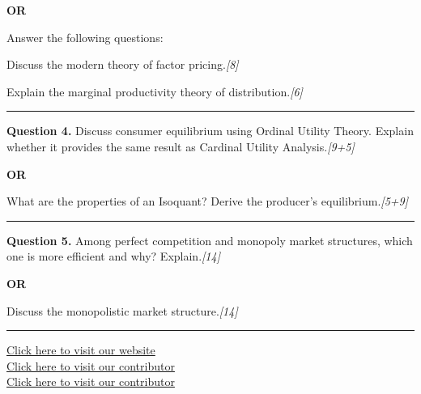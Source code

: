 \documentclass[11pt,a4paper]{article}
\newcommand{\pts}[1]{\hfill   \textit{[#1]}}
\begin{document}
\centerline{   \textbf{OR}}

Answer the following questions:

\begin{parts}
  \item Discuss the modern theory of factor pricing.\pts{8}
  \item Explain the marginal productivity theory of distribution.\pts{6}
\end{parts}

\medskip\rule{\linewidth}{0.2pt}




\noindent   \textbf{Question 4.}
Discuss consumer equilibrium using Ordinal Utility Theory. Explain whether it provides the same result as Cardinal Utility Analysis.\pts{9+5}

\centerline{   \textbf{OR}}

What are the properties of an Isoquant? Derive the producer's equilibrium.\pts{5+9}

\medskip\rule{\linewidth}{0.2pt}




\noindent   \textbf{Question 5.}
Among perfect competition and monopoly market structures, which one is more efficient and why? Explain.\pts{14}

\centerline{   \textbf{OR}}

Discuss the monopolistic market structure.\pts{14}

\vfill
\rule{\linewidth}{0.4pt}

\begin{center}\small
\href{https://bhu-exam.vercel.app/}{Click here to visit our website}\\[4pt]
\href{https://me-aryan.vercel.app/}{Click here to visit our contributor}\\[4pt]
\href{https://quashan-me.vercel.app/}{Click here to visit our contributor}
\end{center}
\end{document}
